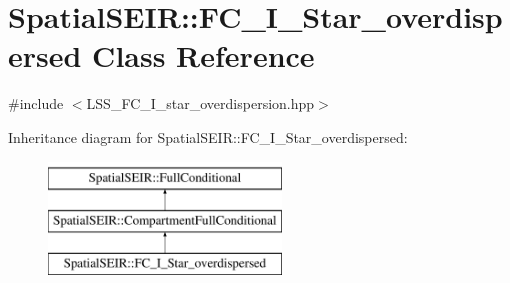 \hypertarget{classSpatialSEIR_1_1FC__I__Star__overdispersed}{\section{Spatial\-S\-E\-I\-R\-:\-:F\-C\-\_\-\-I\-\_\-\-Star\-\_\-overdispersed Class Reference}
\label{classSpatialSEIR_1_1FC__I__Star__overdispersed}
}


{\ttfamily \#include $<$L\-S\-S\-\_\-\-F\-C\-\_\-\-I\-\_\-star\-\_\-overdispersion.\-hpp$>$}

Inheritance diagram for Spatial\-S\-E\-I\-R\-:\-:F\-C\-\_\-\-I\-\_\-\-Star\-\_\-overdispersed\-:\begin{figure}[H]
\begin{center}
\leavevmode
\includegraphics[height=3.000000cm]{classSpatialSEIR_1_1FC__I__Star__overdispersed}
\end{center}
\end{figure}
